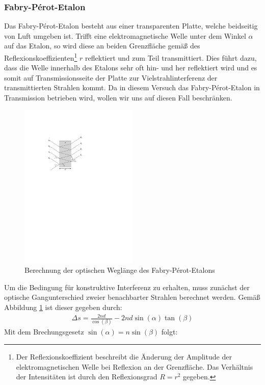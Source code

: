 \documentclass[11pt, a4paper]{article}
\begin{document}
\subsubsection{Fabry-Pérot-Etalon}
Das Fabry-Pérot-Etalon besteht aus einer transparenten Platte, welche beidseitig von Luft umgeben ist.
Trifft eine elektromagnetische Welle unter dem Winkel $\alpha$ auf das Etalon, so wird diese an beiden Grenzfläche gemäß des Reflexionskoeffizienten\footnote{Der Reflexionskoeffizient beschreibt die Änderung der Amplitude der elektromagnetischen Welle bei Reflexion an der Grenzfläche. Das Verhältnis der Intensitäten ist durch den Reflexionsgrad $R = r^2$ gegeben.} $r$ reflektiert und zum Teil transmittiert.
Dies führt dazu, dass die Welle innerhalb des Etalons sehr oft hin- und her reflektiert wird und es somit auf Transmissionsseite der Platte zur Vielstrahlinterferenz der transmittierten Strahlen kommt.
Da in diesem Versuch das Fabry-Pérot-Etalon in Transmission betrieben wird, wollen wir uns auf diesen Fall beschränken.
\begin{figure}[h]
	\centering
	\includegraphics[width=0.5\textwidth]{./figures/fabry_perot.pdf}
	\caption{Berechnung der optischen Weglänge des Fabry-Pérot-Etalons}
	\label{fig:fabry_perot}
\end{figure}
Um die Bedingung für konstruktive Interferenz zu erhalten, muss zunächst der optische Gangunterschied zweier benachbarter Strahlen berechnet werden.
Gemäß Abbildung \ref{fig:fabry_perot} ist dieser gegeben durch:
\begin{align*}
	\Delta s = \frac{2 n d}{\cos(\beta)} - 2 n d \sin(\alpha) \tan(\beta)
\end{align*}
Mit dem Brechungsgesetz $\sin(\alpha) = n \sin(\beta)$ folgt:
\end{document}
